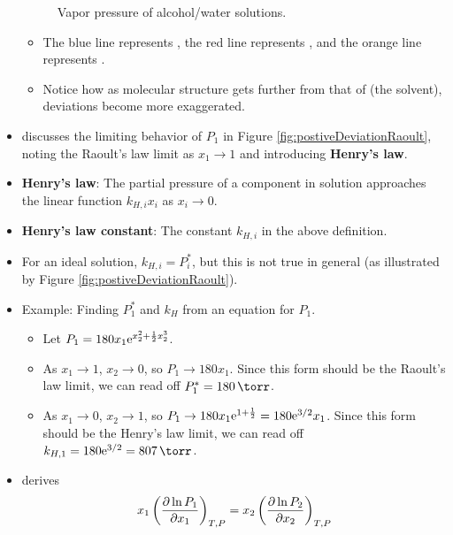 \documentclass[../notes.tex]{subfiles}
\begin{document}
\begin{itemize}
\begin{figure}[H]
        \caption{Vapor pressure of alcohol/water solutions.}
        \label{fig:VPalcoholWater}
    \end{figure}
    \begin{itemize}
        \item The blue line represents , the red line represents , and the orange line represents .
        \item Notice how as molecular structure gets further from that of  (the solvent), deviations become more exaggerated.
    \end{itemize}
    \item \textcite{bib:McQuarrieSimon} discusses the limiting behavior of $P_1$ in Figure \ref{fig:postiveDeviationRaoult}, noting the Raoult's law limit as $x_1\to 1$ and introducing \textbf{Henry's law}.
    \item \textbf{Henry's law}: The partial pressure of a component in solution approaches the linear function $k_{H,i}x_i$ as $x_i\to 0$.
    \item \textbf{Henry's law constant}: The constant $k_{H,i}$ in the above definition.
    \item For an ideal solution, $k_{H,i}=P_i^*$, but this is not true in general (as illustrated by Figure \ref{fig:postiveDeviationRaoult}).
    \item Example: Finding $P_1^*$ and $k_H$ from an equation for $P_1$.
    \begin{itemize}
        \item Let $P_1=180x_1\e[x_2^2+\frac{1}{2}x_2^3]$.
        \item As $x_1\to 1$, $x_2\to 0$, so $P_1\to 180x_1$. Since this form should be the Raoult's law limit, we can read off $P_1^*=\SI{180}{\torr}$.
        \item As $x_1\to 0$, $x_2\to 1$, so $P_1\to 180x_1\e[1+\frac{1}{2}]=180\e[3/2]x_1$. Since this form should be the Henry's law limit, we can read off $k_{H,1}=180\e[3/2]=\SI{807}{\torr}$.
    \end{itemize}
    \item \textcite{bib:McQuarrieSimon} derives
    \begin{equation*}
        x_1\left( \pdv{\ln P_1}{x_1} \right)_{T,P} = x_2\left( \pdv{\ln P_2}{x_2} \right)_{T,P}
    \end{equation*}

\end{itemize}
\end{document}
